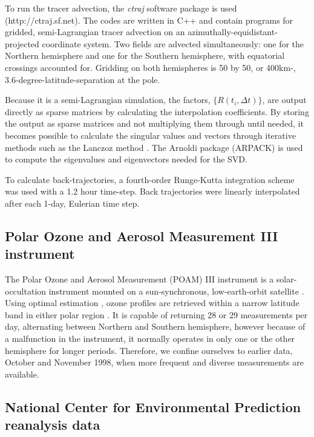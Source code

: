 \documentclass{article}
\begin{document}
To run the tracer advection, the \textit{ctraj} software package is used
(http://ctraj.sf.net).  The codes are written in C++ and contain programs
for gridded, semi-Lagrangian tracer advection on an 
azimuthally-equidistant-projected coordinate system.
Two fields are advected simultaneously: one for the Northern hemisphere
and one for the Southern hemisphere, with equatorial crossings accounted for.
Gridding on both hemispheres is 50 by 50, or 400km-,
3.6-degree-latitude-separation at the pole.

Because it is a semi-Lagrangian simulation, the factors, $\lbrace R(t_i,\Delta t) \rbrace$,
are output directly as sparse matrices by calculating the interpolation coefficients.
By storing the output as sparse matrices and not multiplying them through until
needed, it becomes possible to calculate the singular values and vectors through iterative
methods such as the Lanczoz method \citep{Golub_Van_Loan1996}.
The Arnoldi package (ARPACK) \citep{Lehoucq_Scott1996} is used to compute the
eigenvalues and eigenvectors needed for the SVD.

To calculate back-trajectories, a fourth-order Runge-Kutta integration scheme
was used with a 1.2 hour time-step.
Back trajectories were linearly interpolated after each 1-day, Eulerian time step.

\subsection{Polar Ozone and Aerosol Measurement III instrument}

The Polar Ozone and Aerosol Measurement (POAM) III instrument is a solar-
occultation instrument mounted on a sun-synchronous, low-earth-orbit
satellite \citep{Lucke_etal1999}.  
Using optimal estimation \citep{Rodgers2000}, ozone profiles are retrieved 
within a narrow latitude band in either polar region \citep{Lumpe_etal2002}.  
It is capable of returning 28 or 29 measurements per day,
alternating between Northern and Southern hemisphere, however because of
a malfunction
in the instrument, it normally operates in only one or the other hemisphere for longer periods.  Therefore, we confine ourselves to earlier data,
October and November 1998, when more frequent and diverse measurements
are available.

\subsection{National Center for Environmental Prediction reanalysis data}
\end{document}
